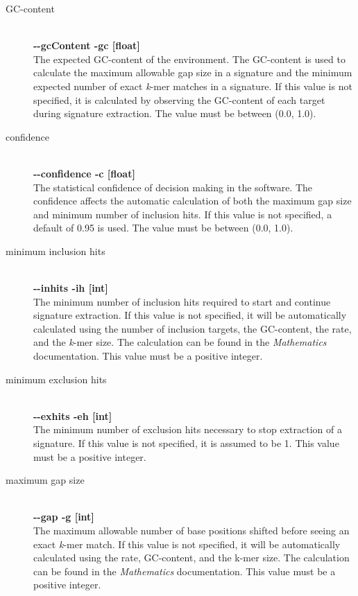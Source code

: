 \documentclass[a4paper,10pt]{article}
\begin{document}
\begin{description}
  \item[GC-content] \hfill \\
  \textbf{-{}-gcContent -gc [float]} \hfill \\
  The expected GC-content of the environment. The GC-content is used to calculate the maximum allowable gap size in a signature and the minimum expected number of exact \textit{k}-mer matches in a signature. If this value is not specified, it is calculated by observing the GC-content of each target during signature extraction. The value must be between (0.0, 1.0).
  
  \item[confidence] \hfill \\
  \textbf{-{}-confidence -c [float]} \hfill \\
  The statistical confidence of decision making in the software. The confidence affects the automatic calculation of both the maximum gap size and minimum number of inclusion hits. If this value is not specified, a default of 0.95 is used. The value must be between (0.0, 1.0).
  
  \item[minimum inclusion hits] \hfill \\
  \textbf{-{}-inhits -ih [int]} \hfill \\
  The minimum number of inclusion hits required to start and continue signature extraction. If this value is not specified, it will be automatically calculated using the number of inclusion targets, the GC-content, the rate, and the \textit{k}-mer size. The calculation can be found in the \textit{Mathematics} documentation. This value must be a positive integer.
  
  \item[minimum exclusion hits] \hfill \\
  \textbf{-{}-exhits -eh [int]} \hfill \\
  The minimum number of exclusion hits necessary to stop extraction of a signature. If this value is not specified, it is assumed to be 1. This value must be a positive integer.
  
  \item[maximum gap size] \hfill \\
  \textbf{-{}-gap -g [int]} \hfill \\
  The maximum allowable number of base positions shifted before seeing an exact \textit{k}-mer match. If this value is not specified, it will be automatically calculated using the rate, GC-content, and the k-mer size. The calculation can be found in the \textit{Mathematics} documentation. This value must be a positive integer.
  

\end{description}
\end{document}
